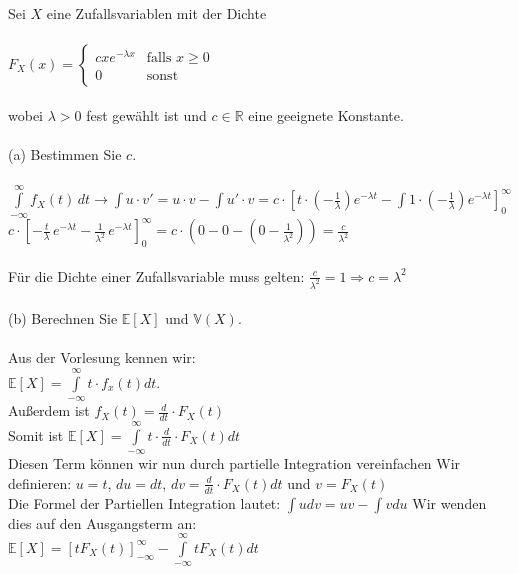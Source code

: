 \documentclass[a4paper]{article}
\begin{document}
\subsection{}
Sei $X$ eine Zufallsvariablen mit der Dichte\\\\
\(F_X(x)=\begin{cases}
    cxe^{-\lambda x} & \text{falls } x \geq 0\\
    0 & \text{sonst}
\end{cases}\)\\\\
wobei $\lambda > 0$ fest gewählt ist und $c \in \mathbb{R}$ eine geeignete Konstante.\\\\
(a) Bestimmen Sie $c$.\\\\
\(\int\limits^\infty_{-\infty} f_X(t)\, dt \rightarrow \int u\cdot v' = u\cdot v - \int u' \cdot v = c \cdot \left[t\cdot \left(-\frac{1}{\lambda}\right)e^{-\lambda t} - \int 1 \cdot \left(-\frac{1}{\lambda}\right)e^{-\lambda t}\right]^\infty_0\)\\
\(c \cdot \left[-\frac{t}{\lambda}\, e^{-\lambda t}-\frac{1}{\lambda^2}\, e^{-\lambda t}\right]^\infty_0=c\cdot \left(0-0-\left(0-\frac{1}{\lambda^2}\right)\right)=\frac{c}{\lambda^2}\)\\\\
Für die Dichte einer Zufallsvariable muss gelten: \(\frac{c}{\lambda^2}=1 \Rightarrow c = \lambda^2\) \\\\
(b) Berechnen Sie $\mathbb{E}[X]$ und $\mathbb{V}(X)$.\\\\
Aus der Vorlesung kennen wir:\\
$\mathbb{E}[X] = \int\limits_{-\infty}^{\infty} t \cdot f_x(t) dt$.\\
Außerdem ist $f_X(t) = \frac{d}{dt} \cdot F_X(t)$\\
Somit ist $\mathbb{E}[X] = \int\limits_{-\infty}^{\infty} t \cdot \frac{d}{dt} \cdot F_X(t) dt$\\
Diesen Term können wir nun durch partielle Integration vereinfachen Wir definieren: $u = t$, $du = dt$, $dv = \frac{d}{dt} \cdot F_X(t)dt$ und $v = F_X(t)$\\
Die Formel der Partiellen Integration lautet: $\int u dv = uv - \int v du$
Wir wenden dies auf den Ausgangsterm an:\\
$\mathbb{E}[X] = [tF_X(t)]_{-\infty}^\infty - \int\limits_{-\infty}^\infty t F_X(t) dt$\\
\end{document}
